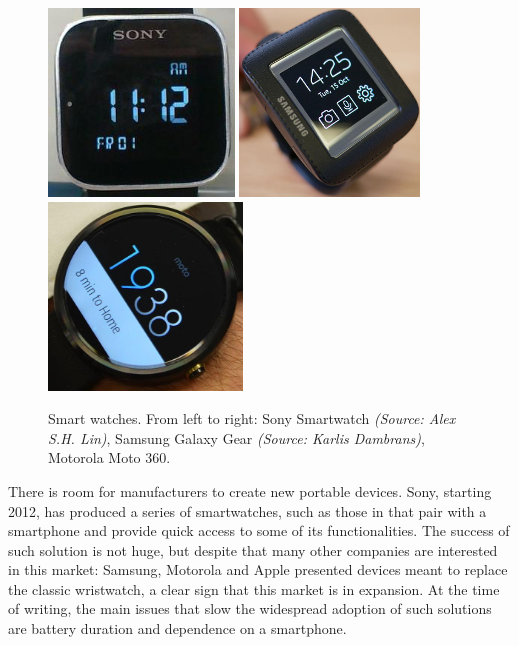 \documentclass[12pt,a4paper,twoside,openright]{book}
\begin{document}
\begin{figure}
	\centering
	\includegraphics[height=5cm]{img/sony-sw}
	\includegraphics[height=5cm]{img/samsung-gg}
	\includegraphics[height=5cm]{img/moto360}
	\caption{Smart watches. From left to right: Sony Smartwatch \emph{(Source: Alex S.H. Lin)}, Samsung Galaxy Gear \emph{(Source: Karlis Dambrans)}, Motorola Moto 360.}
	\label{img:watches}
\end{figure}

There is room for manufacturers to create new portable devices.
%
Sony, starting 2012, has produced a series of smartwatches, such as those in  that pair with a smartphone and provide quick access to some of its functionalities.
%
The success of such solution is not huge, but despite that many other companies are interested in this market: Samsung, Motorola and Apple presented devices meant to replace the classic wristwatch, a clear sign that this market is in expansion.
%
At the time of writing, the main issues that slow the widespread adoption of such solutions are battery duration and dependence on a smartphone.
\end{document}
